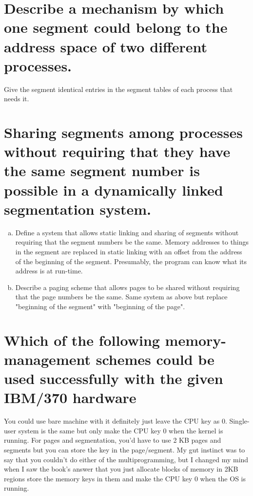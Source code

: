 \documentclass{book}%
\begin{document}
\section{Describe a mechanism by which one segment could belong to the address space of two different processes.}
Give the segment identical entries in the segment tables of each process that needs it.
\section{Sharing segments among processes without requiring that they have the same segment number is possible in a dynamically linked segmentation system.}
\begin{enumerate}[(a)]
\item Define a system that allows static linking and sharing of segments without requiring that the segment numbers be the same.
Memory addresses to things in the segment are replaced in static linking with an offset from the address of the beginning of the segment. Presumably, the program can know what its address is at run-time.
\item Describe a paging scheme that allows pages to be shared without requiring that the page numbers be the same. 
Same system as above but replace "beginning of the segment" with "beginning of the page".
\end{enumerate}
\section{Which of the following memory-management schemes could be used successfully with the given IBM/370 hardware}
You could use bare machine with it definitely just leave the CPU key as 0. Single-user system is the same but only make the CPU key 0 when the kernel is running. For pages and segmentation, you'd have to use 2 KB pages and segments but you can store the key in the page/segment. My gut instinct was to say that you couldn't do either of the multiprogramming, but I changed my mind when I saw the book's answer that you just allocate blocks of memory in 2KB regions store the memory keys in them and make the CPU key 0 when the OS is running.
\end{document}
